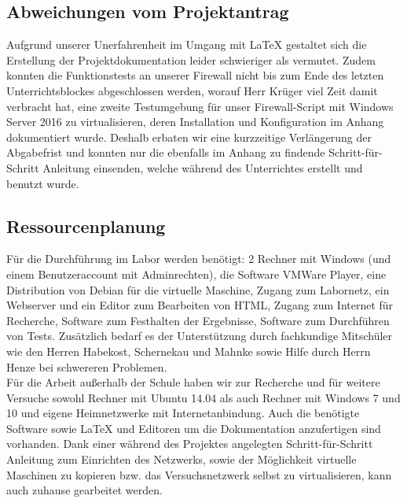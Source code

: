 \subsection{Abweichungen vom Projektantrag}
\label{sec:AbweichungenProjektantrag}

    Aufgrund unserer Unerfahrenheit im Umgang mit \LaTeX{} gestaltet sich die Erstellung der Projektdokumentation leider schwieriger als vermutet. Zudem konnten die Funktionstests an unserer Firewall nicht bis zum Ende des letzten Unterrichtsblockes abgeschlossen werden, worauf Herr Krüger viel Zeit damit verbracht hat, eine zweite Testumgebung für unser Firewall-Script mit Windows Server 2016 zu virtualisieren, deren Installation und Konfiguration im Anhang dokumentiert wurde. Deshalb erbaten wir  eine kurzzeitige Verlängerung der Abgabefrist und konnten nur die ebenfalls im Anhang zu findende Schritt-für-Schritt Anleitung einsenden, welche während des Unterrichtes erstellt und benutzt wurde.

\subsection{Ressourcenplanung}
\label{sec:Ressourcenplanung}

Für die Durchführung im Labor werden benötigt: 2 Rechner mit Windows (und einem Benutzeraccount mit Adminrechten), die Software VMWare Player, eine Distribution von Debian für die virtuelle Maschine, Zugang zum Labornetz, ein Webserver und ein Editor zum Bearbeiten von HTML, Zugang zum Internet für Recherche, Software zum Festhalten der Ergebnisse, Software zum Durchführen von Tests. Zusätzlich bedarf es der Unterstützung durch fachkundige Mitschüler wie den Herren Habekost, Schernekau und Mahnke sowie Hilfe durch Herrn Henze bei schwereren Problemen.\\
Für die Arbeit außerhalb der Schule haben wir zur Recherche und für weitere Versuche sowohl Rechner mit Ubuntu 14.04 als auch Rechner mit Windows 7 und 10 und eigene Heimnetzwerke mit Internetanbindung. Auch die benötigte Software sowie \LaTeX{} und Editoren um die Dokumentation anzufertigen sind vorhanden. Dank einer während des Projektes angelegten Schritt-für-Schritt Anleitung zum Einrichten des Netzwerks, sowie der Möglichkeit virtuelle Maschinen zu kopieren bzw. das Versuchsnetzwerk selbst zu virtualisieren, kann auch zuhause gearbeitet werden.

